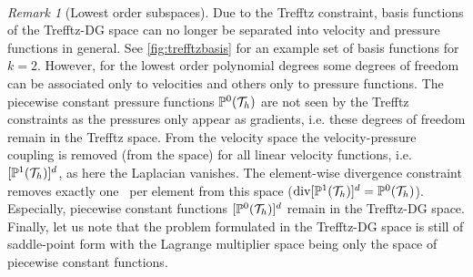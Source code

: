 \documentclass[pdflatex,sn-mathphys,Numbered]{sn-jnl}%
\theoremstyle{remark}%
\newtheorem{remark}{Remark}%
\theoremstyle{definition}%
\begin{document}
~
\begin{remark}[Lowest order subspaces]\label{rem:loworder} Due to the
  Trefftz constraint, basis functions of the Trefftz-DG space can no
  longer be separated into velocity and pressure functions in general.
  See \cref{fig:trefftzbasis} for an example set of basis functions
  for $k=2$. However, for the lowest order polynomial degrees some
  degrees of freedom can be associated only to velocities and others
  only to pressure functions. The piecewise constant pressure
  functions $\mathbb{P}^0({\mathcal{T}_h})$ are not seen by the Trefftz constraints as
  the pressures only appear as gradients, i.e. these degrees of
  freedom remain in the Trefftz space. From the velocity space the
  velocity-pressure coupling is removed (from the space) for all
  linear velocity functions, i.e. $[\mathbb{P}^1({\mathcal{T}_h})]^d$, as here the
  Laplacian vanishes. The element-wise divergence constraint removes
  exactly one \dof ~per element from this space ($\operatorname{\mathrm{div}} [\mathbb{P}^1({\mathcal{T}_h})]^d
  = \mathbb{P}^0({\mathcal{T}_h})$). Especially, piecewise constant functions
  $[\mathbb{P}^0({\mathcal{T}_h})]^d$ remain in the Trefftz-DG space. Finally, let us
  note that the problem formulated in the Trefftz-DG space is still of
  saddle-point form with the Lagrange multiplier space being only the
  space of piecewise constant functions. 
\end{remark}

\end{document}
